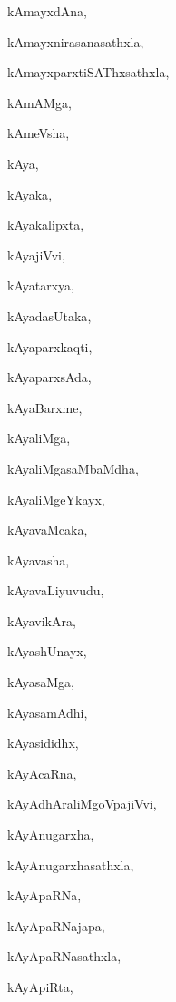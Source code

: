 \begin{multicols}{2}
{kAmayxdAna}, \pageref{kAmayxdAna}

{kAmayxnirasanasathxla}, \pageref{kAmayxnirasanasathxla}

{kAmayxparxtiSAThxsathxla}, \pageref{kAmayxparxtiSAThxsathxla}

{kAmAMga}, \pageref{kAmAMga}

{kAmeVsha}, \pageref{kAmeVsha}

{kAya}, \pageref{kAya}

{kAyaka}, \pageref{kAyaka}

{kAyakalipxta}, \pageref{kAyakalipxta}

{kAyajiVvi}, \pageref{kAyajiVvi}

{kAyatarxya}, \pageref{kAyatarxya}

{kAyadasUtaka}, \pageref{kAyadasUtaka}

{kAyaparxkaqti}, \pageref{kAyaparxkaqti}

{kAyaparxsAda}, \pageref{kAyaparxsAda}

{kAyaBarxme}, \pageref{kAyaBarxme}

{kAyaliMga}, \pageref{kAyaliMga}

{kAyaliMgasaMbaMdha}, \pageref{kAyaliMgasaMbaMdha}

{kAyaliMgeYkayx}, \pageref{kAyaliMgeYkayx}

{kAyavaMcaka}, \pageref{kAyavaMcaka}

{kAyavasha}, \pageref{kAyavasha}

{kAyavaLiyuvudu}, \pageref{kAyavaLiyuvudu}

{kAyavikAra}, \pageref{kAyavikAra}

{kAyashUnayx}, \pageref{kAyashUnayx}

{kAyasaMga}, \pageref{kAyasaMga}

{kAyasamAdhi}, \pageref{kAyasamAdhi}

{kAyasididhx}, \pageref{kAyasididhx}

{kAyAcaRna}, \pageref{kAyAcaRna}

{kAyAdhAraliMgoVpajiVvi}, \pageref{kAyAdhAraliMgoVpajiVvi}

{kAyAnugarxha}, \pageref{kAyAnugarxha}

{kAyAnugarxhasathxla}, \pageref{kAyAnugarxhasathxla}

{kAyApaRNa}, \pageref{kAyApaRNa}

{kAyApaRNajapa}, \pageref{kAyApaRNajapa}

{kAyApaRNasathxla}, \pageref{kAyApaRNasathxla}

{kAyApiRta}, \pageref{kAyApiRta}


\end{multicols}
